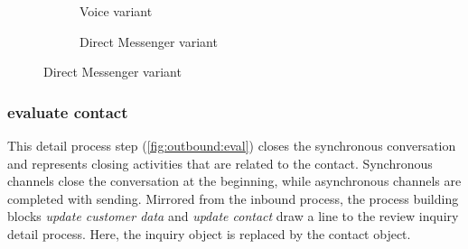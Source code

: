 \begin{figure}[caption={contact customer detail process}, label={fig:outbound:con}]
\begin{subfigure}[b]{.45\textwidth}
\begin{tikzpicture}
	 		\end{tikzpicture}
	 		\caption{Voice variant}\label{fig:outbound:con:voice}
	 	\end{subfigure}
	 	\begin{subfigure}[b]{.45\textwidth}
	 		\centering	
	 		\caption{Direct Messenger variant}\label{fig:outbound:con:dm}
	 	\end{subfigure}
	 \end{figure}
	 
	 
	 
	 \subsubsection{evaluate contact}
	 
	 This detail process step (\Fig \ref{fig:outbound:eval}) closes the synchronous conversation and represents closing activities that are related to the contact. Synchronous channels close the conversation at the beginning, while asynchronous channels are completed with sending. Mirrored from the inbound process, the process building blocks \textit{update customer data} and \textit{update contact} draw a line to the review inquiry detail process. Here, the inquiry object is replaced by the contact object. 
	 
